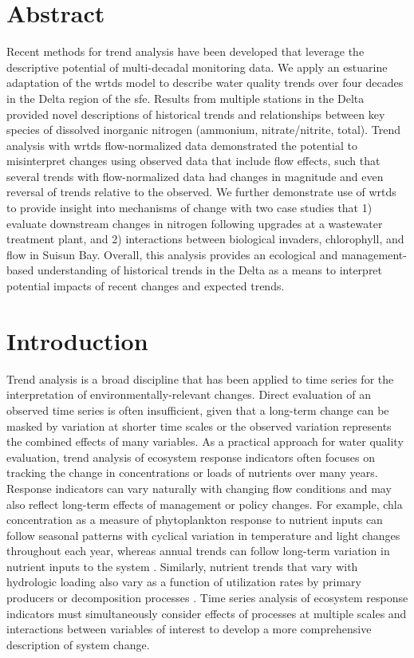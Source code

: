 \documentclass[letterpaper,12pt,oneside]{article}\usepackage[]{graphicx}\usepackage[]{color}
\begin{document}
\section*{Abstract}
\noindent Recent methods for trend analysis have been developed that leverage the descriptive potential of multi-decadal monitoring data.  We apply an estuarine adaptation of the \ac{wrtds} model to describe water quality trends over four decades in the Delta region of the \ac{sfe}. Results from multiple stations in the Delta provided novel descriptions of historical trends and relationships between key species of dissolved inorganic nitrogen (ammonium, nitrate/nitrite, total).  Trend analysis with \ac{wrtds} flow-normalized data demonstrated the potential to misinterpret changes using observed data that include flow effects, such that several trends with flow-normalized data had changes in magnitude and even reversal of trends relative to the observed.  We further demonstrate use of \ac{wrtds} to provide insight into mechanisms of change with two case studies that 1) evaluate downstream changes in nitrogen following upgrades at a wastewater treatment plant, and 2) interactions between biological invaders, chlorophyll, and flow in Suisun Bay.  Overall, this analysis provides an ecological and management-based understanding of historical trends in the Delta as a means to interpret potential impacts of recent changes and expected trends.
\acresetall

\section{Introduction}

Trend analysis is a broad discipline that has been applied to time series for the interpretation of environmentally-relevant changes.  Direct evaluation of an observed time series is often insufficient, given that a long-term change can be masked by variation at shorter time scales or the observed variation represents the combined effects of many variables\cite{Oneill89,Levin92}.  As a practical approach for water quality evaluation, trend analysis of ecosystem response indicators often focuses on tracking the change in concentrations or loads of nutrients over many years. Response indicators can vary naturally with changing flow conditions and may also reflect long-term effects of management or policy changes. For example, \ac{chla} concentration as a measure of phytoplankton response to nutrient inputs can follow seasonal patterns with cyclical variation in temperature and light changes throughout each year, whereas annual trends can follow long-term variation in nutrient inputs to the system \cite{Cloern96,Cloern10}. Similarly, nutrient trends that vary with hydrologic loading also vary as a function of utilization rates by primary producers or decomposition processes \cite{Sakamoto89,Schultz08,Harding16}. Time series analysis of ecosystem response indicators must simultaneously consider effects of processes at multiple scales and interactions between variables of interest to develop a more comprehensive description of system change. 
\end{document}
